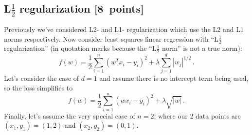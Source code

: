 \documentclass{article}
\newcommand\pts[1]{\textcolor{pointscolour}{[#1~points]}}
\begin{document}
\subsection{L$\frac12$ regularization \pts{8}}

Previously we've considered L2- and L1- regularization which use the L2 and L1 norms respectively. Now consider
least squares linear regression with ``L$\frac12$ regularization'' (in quotation marks because the ``L$\frac12$ norm'' is not a true norm):
\[
f(w) = \frac{1}{2} \sum_{i=1}^n (w^Tx_i - y_i)^2 + \lambda \sum_{j=1}^d |w_j|^{1/2} \, .
\]
Let's consider the case of $d=1$ and
assume there is no intercept term being used, so the loss simplifies to
\[
f(w) = \frac{1}{2} \sum_{i=1}^n (wx_i - y_i)^2 + \lambda \sqrt{|w|} \, .
\]
Finally, let's assume the very special case of $n=2$,
where our 2 data points are $(x_1,y_1)=(1,2)$ and $(x_2,y_2)=(0,1)$.
\end{document}
